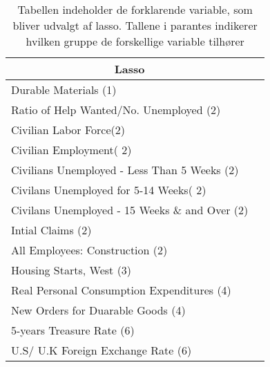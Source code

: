  \begin{table}
\small
\center
\begin{tabular}{lc }
\toprule
\multicolumn{1}{c}{Lasso} \\ \midrule
Durable Materials (1) \\
Ratio of Help Wanted/No. Unemployed (2) \\
Civilian Labor Force(2) \\
Civilian Employment( 2) \\
Civilians Unemployed - Less Than 5 Weeks (2) \\
Civilans Unemployed for 5-14 Weeks( 2) \\
Civilans Unemployed - 15 Weeks \& and Over (2) \\
Intial Claims (2) \\
All Employees: Construction (2) \\
Housing Starts, West (3) \\
Real Personal Consumption Expenditures (4) \\
New Orders for Duarable Goods (4) \\
5-years Treasure Rate (6) \\
U.S/ U.K Foreign Exchange Rate (6) \\ \bottomrule
\end{tabular}
\caption{Tabellen indeholder de forklarende variable, som bliver udvalgt af lasso. Tallene i parantes indikerer hvilken gruppe de forskellige variable tilhører} \label{tab:lars_ud}
\end{table}